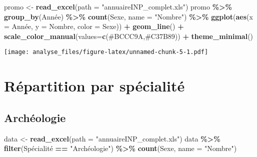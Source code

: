 \documentclass[
]{article}
\newenvironment{Shaded}{\begin{snugshade}}{\end{snugshade}}
\newcommand{\DataTypeTok}[1]{\textcolor[rgb]{0.13,0.29,0.53}{#1}}
\newcommand{\KeywordTok}[1]{\textcolor[rgb]{0.13,0.29,0.53}{\textbf{#1}}}
\newcommand{\NormalTok}[1]{#1}
\newcommand{\OperatorTok}[1]{\textcolor[rgb]{0.81,0.36,0.00}{\textbf{#1}}}
\newcommand{\StringTok}[1]{\textcolor[rgb]{0.31,0.60,0.02}{#1}}
\begin{document}
\begin{Shaded}
\begin{Highlighting}[]
\NormalTok{promo \textless{}{-}}\StringTok{ }\KeywordTok{read\_excel}\NormalTok{(}\DataTypeTok{path =} \StringTok{"annuaireINP\_complet.xls"}\NormalTok{)}
\NormalTok{promo }\OperatorTok{\%\textgreater{}\%}
\StringTok{  }\KeywordTok{group\_by}\NormalTok{(Année) }\OperatorTok{\%\textgreater{}\%}\StringTok{ }
\StringTok{  }\KeywordTok{count}\NormalTok{(Sexe, }\DataTypeTok{name =} \StringTok{"Nombre"}\NormalTok{) }\OperatorTok{\%\textgreater{}\%}\StringTok{ }
\StringTok{  }\KeywordTok{ggplot}\NormalTok{(}\KeywordTok{aes}\NormalTok{(}\DataTypeTok{x =}\NormalTok{ Année, }\DataTypeTok{y =}\NormalTok{ Nombre, }\DataTypeTok{color =}\NormalTok{ Sexe)) }\OperatorTok{+}
\StringTok{    }\KeywordTok{geom\_line}\NormalTok{() }\OperatorTok{+}
\StringTok{    }\KeywordTok{scale\_color\_manual}\NormalTok{(}\DataTypeTok{values=}\KeywordTok{c}\NormalTok{(}\StringTok{\textquotesingle{}\#BCCC9A\textquotesingle{}}\NormalTok{,}\StringTok{\textquotesingle{}\#C37B89\textquotesingle{}}\NormalTok{)) }\OperatorTok{+}
\StringTok{    }\KeywordTok{theme\_minimal}\NormalTok{()}
\end{Highlighting}
\end{Shaded}

\texttt{[image: analyse\_files/figure-latex/unnamed-chunk-5-1.pdf]}

\hypertarget{ruxe9partition-par-spuxe9cialituxe9}{%
\section{Répartition par
spécialité}\label{ruxe9partition-par-spuxe9cialituxe9}}

\hypertarget{archuxe9ologie}{%
\subsection{Archéologie}\label{archuxe9ologie}}

\begin{Shaded}
\begin{Highlighting}[]
\NormalTok{data \textless{}{-}}\StringTok{ }\KeywordTok{read\_excel}\NormalTok{(}\DataTypeTok{path =} \StringTok{"annuaireINP\_complet.xls"}\NormalTok{)}
\NormalTok{data }\OperatorTok{\%\textgreater{}\%}
\StringTok{  }\KeywordTok{filter}\NormalTok{(Spécialité }\OperatorTok{==}\StringTok{ "Archéologie"}\NormalTok{) }\OperatorTok{\%\textgreater{}\%}\StringTok{ }
\StringTok{  }\KeywordTok{count}\NormalTok{(Sexe, }\DataTypeTok{name =} \StringTok{"Nombre"}\NormalTok{)}
\end{Highlighting}
\end{Shaded}
\end{document}
